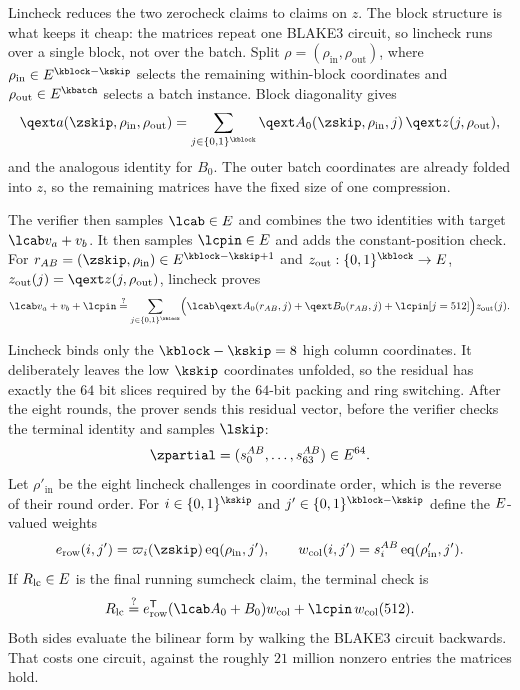 Lincheck reduces the two zerocheck claims to claims on $z$. The block structure is what keeps it cheap: the matrices repeat one BLAKE3 circuit, so lincheck runs over a single block, not over the batch. Split $\rho=(\rho_{\mathrm{in}},\rho_{\mathrm{out}})$, where $\rho_{\mathrm{in}}\in\E^{\kblock-\kskip}$ selects the remaining within-block coordinates and $\rho_{\mathrm{out}}\in\E^{\kbatch}$ selects a batch instance. Block diagonality gives
\[
\qext a(\zskip,\rho_{\mathrm{in}},\rho_{\mathrm{out}})=\sum_{j\in\cube{\kblock}}\qext A_0(\zskip,\rho_{\mathrm{in}},j)\,\qext z(j,\rho_{\mathrm{out}}),
\]
and the analogous identity for $B_0$. The outer batch coordinates are already folded into $z$, so the remaining matrices have the fixed size of one compression.

The verifier then samples $\lcab\in\E$ and combines the two identities with target $\lcab v_a+v_b$. It then samples $\lcpin\in\E$ and adds the constant-position check. For $r_{AB}=(\zskip,\rho_{\mathrm{in}})\in\E^{\kblock-\kskip+1}$ and $z_{\mathrm{out}}:\cube{\kblock}\to\E$, $z_{\mathrm{out}}(j)=\qext z(j,\rho_{\mathrm{out}})$, lincheck proves
\begin{equation}\label{flock:eq:lincheck}
\lcab v_a+v_b+\lcpin\qeq\sum_{j\in\cube{\kblock}}\Bigl(\lcab\qext A_0(r_{AB},j)+\qext B_0(r_{AB},j)+\lcpin[j=512]\Bigr)z_{\mathrm{out}}(j).
\end{equation}

Lincheck binds only the $\kblock-\kskip=8$ high column coordinates. It deliberately leaves the low $\kskip$ coordinates unfolded, so the residual has exactly the $64$ bit slices required by the $64$-bit packing and ring switching. After the eight rounds, the prover sends this residual vector, before the verifier checks the terminal identity and samples $\lskip$:
\[
\zpartial=(s^{AB}_0,\ldots,s^{AB}_{63})\in\E^{64}.
\]
Let $\rho'_{\mathrm{in}}$ be the eight lincheck challenges in coordinate order, which is the reverse of their round order. For $i\in\cube{\kskip}$ and $j'\in\cube{\kblock-\kskip}$ define the $E$-valued weights
\[
e_{\mathrm{row}}(i,j')=\lag_i(\zskip)\eq(\rho_{\mathrm{in}},j'),\qquad w_{\mathrm{col}}(i,j')=s_i^{AB}\eq(\rho'_{\mathrm{in}},j').
\]
If $R_{\mathrm{lc}}\in E$ is the final running sumcheck claim, the terminal check is
\begin{equation}\label{flock:eq:lincheck-terminal}
R_{\mathrm{lc}}\qeq e_{\mathrm{row}}^{\mathsf T}(\lcab A_0+B_0)w_{\mathrm{col}}+\lcpin\,w_{\mathrm{col}}(512).
\end{equation}
Both sides evaluate the bilinear form by walking the BLAKE3 circuit backwards. That costs one circuit, against the roughly $21$ million nonzero entries the matrices hold.

